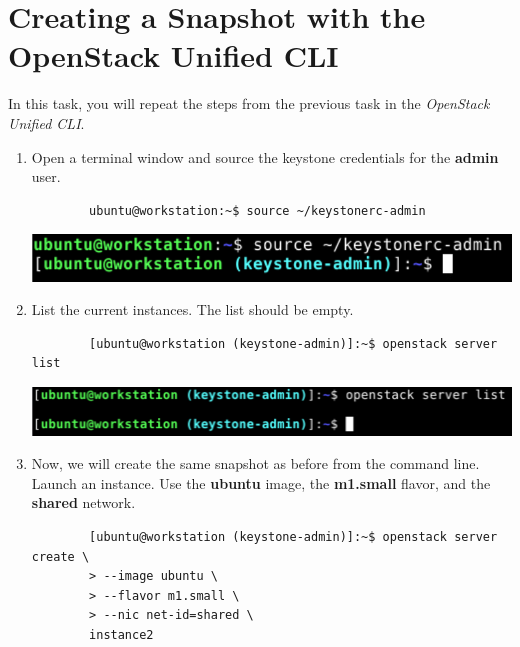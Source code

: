 \documentclass[letterpaper, 12pt]{article}
\begin{document}
\section{Creating a Snapshot with the OpenStack Unified CLI}
\label{sec:creating_a_snapshot_cli}
In this task, you will repeat the steps from the previous task in the \textit{OpenStack Unified CLI}.

\begin{enumerate}
    \item Open a terminal window and source the keystone credentials for the \textbf{admin} user.
    \begin{lstlisting}
        ubuntu@workstation:~$ source ~/keystonerc-admin
    \end{lstlisting}

    \begin{center}
        \includegraphics[width=\linewidth]{images/part2/step1.png}
    \end{center}

    \item List the current instances.
    The list should be empty.
    \begin{lstlisting}
        [ubuntu@workstation (keystone-admin)]:~$ openstack server list
    \end{lstlisting}

    \begin{center}
        \includegraphics[width=\linewidth]{images/part2/step2.png}
    \end{center}

    \item Now, we will create the same snapshot as before from the command line.
    Launch an instance.
    Use the \textbf{ubuntu} image, the \textbf{m1.small} flavor, and the \textbf{shared} network.
    \begin{lstlisting}
        [ubuntu@workstation (keystone-admin)]:~$ openstack server create \
        > --image ubuntu \
        > --flavor m1.small \
        > --nic net-id=shared \
        instance2
    \end{lstlisting}


\end{enumerate}
\end{document}
